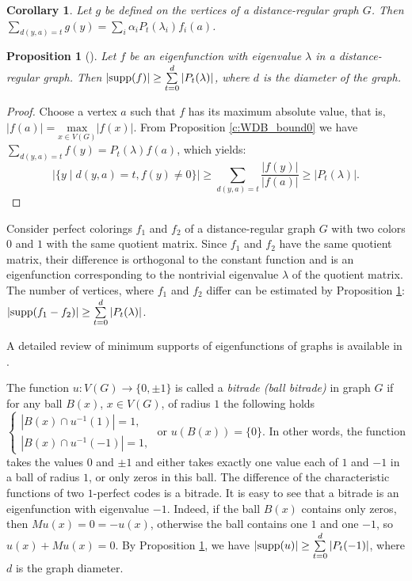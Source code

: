 \documentclass[11pt]{article}
\newtheorem{claim}{Proposition}[section]
\newtheorem{corollary}{Corollary}[section]
\theoremstyle{definition}
\newcommand{\supp}{{\rm supp}}
\begin{document}
{\begin{corollary} Let $g$ be defined on
the vertices of a distance-regular graph $G$. Then
$\sum\limits_{d(y,a)=t}g(y)=\sum_i\alpha_iP_t(\lambda_i) f_i(a)$.
\end{corollary}



\begin{claim}[\cite{KMP}]\label{c:WDB_bound}
Let $f$ be an eigenfunction with eigenvalue $\lambda$ in a
distance-regular graph. Then $|\supp(f)| \ge
\sum\limits^d_{t=0} |P_t(\lambda)|$, where $d$
is the diameter of the graph.
\end{claim}
\begin{proof}
Choose a vertex $a$ such that $f$ has its maximum absolute value, that is, $|f(a)|
= \underset{x\in V(G)}{\mathrm{max}} |f(x)|$. From Proposition
\ref{c:WDB_bound0} we have $\sum\limits_{d(y,a)=t}f(y)=P_t(\lambda)
f(a)$, which yields: $$ |\{y \mid d(y,a)=t, f(y)\ne 0\}|\geq  \sum\limits_{d(y,a)=t}\frac{|f(y)|}{|f(a)|}\geq
|P_t(\lambda)|.$$
\end{proof}

Consider perfect colorings $f_1$ and $f_2$
of a distance-regular graph $G$ with two colors $0$ and $1$ with
the same quotient matrix.
Since $f_1$ and $f_2$ have the same quotient matrix,
their difference is orthogonal to the constant function and is an
eigenfunction corresponding to the nontrivial eigenvalue $\lambda$ of the
quotient matrix.
The number of vertices, where  $f_1$ and $f_2$ differ can be estimated by Proposition \ref{c:WDB_bound}:
$|\supp(f_1-f_2)| \ge \sum\limits_{t=0}^d|P_t(\lambda)|$.

A detailed review of minimum supports of eigenfunctions of graphs is available in \cite{Sot}.

The function $u:V(G)\rightarrow \{0,\pm1\}$ is called a {\sl bitrade (ball bitrade)} in graph $G$ if for any ball $B(x)$, $x\in V(G)$,
of radius $1$
the following holds\\
$
\left\{
\begin{array}{ll}
|B(x)\cap u^{-1}(1)|=1,\\
|B(x)\cap u^{-1}(-1)|=1,
\end{array}
\right.
$
or $u(B(x))=\{0\}$.
In other words, the function takes the values $0$ and $\pm1$ and
either takes exactly one value each of $1$ and $-1$ in a ball of radius $1$,
or only  zeros in this ball. The difference
of the characteristic functions of two $1$-perfect codes is a bitrade.
It is easy to see that a bitrade is an eigenfunction with eigenvalue $-1$. Indeed, if the ball $B(x)$  contains only zeros, then $Mu(x)=0=-u(x)$, otherwise the ball contains one $1$ and one $-1$, so
$u(x)+Mu(x)=0$.
By Proposition \ref{c:WDB_bound}, we have $|\supp(u)| \ge \sum\limits_{t=0}^d|P_t(-1)|$,
where $d$ is the graph diameter.

}
\end{document}
